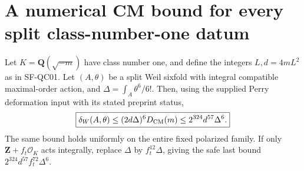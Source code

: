 \section{A numerical CM bound for every split class-number-one datum}

\begin{theorem}
\label{HD-CM6}
Let $K=\mathbf Q(\sqrt{-m})$ have class number one, and define the
integers $L,d=4mL^2$ as in SF-QC01. Let $(A,\theta)$ be a split
Weil sixfold with integral compatible maximal-order action, and
$\Delta=\int_A\theta^6/6!$. Then, using the supplied Perry
deformation input with its stated preprint status,
\[
 \boxed{\delta_W(A,\theta)\le (2d\Delta)^6D_{\rm CM}(m)
                         \le2^{324}d^{57}\Delta^6.}
\]
The same bound holds uniformly on the entire fixed polarized family.
If only $\mathbf Z+f_t\mathcal O_K$ acts integrally, replace
$\Delta$ by $f_t^{12}\Delta$, giving the safe last bound
$2^{324}d^{57}f_t^{72}\Delta^6$.
\end{theorem}
